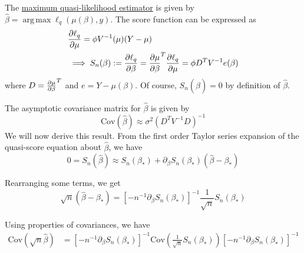 \documentclass[12pt]{article}
\newcommand{\Cov}{\mathrm{Cov}}
\newcommand{\bhat}{\hat{\beta}}
\DeclareMathOperator*{\argmax}{arg\,max}
\numberwithin{equation}{section}
\begin{document}
The \underline{maximum quasi-likelihood estimator} is given by $\bhat = \argmax \ell_q(\mu(\beta), y)$. The score function can be expressed as
\begin{align*}
  & \pdv{\ell_q}{\mu} = \phi V^{-1}(\mu) (Y - \mu) \\
  &\implies S_n(\beta) := \pdv{\ell_q}{\beta} = \pdv{\mu}{\beta}^T \pdv{\ell_q}{\mu} = \phi D^T V^{-1} e(\beta)
\end{align*}
%
where $D = \pdv{\mu}{\beta}^T$ and $e = Y - \mu(\beta)$. Of course, $S_n(\bhat) = 0$ by definition of $\bhat$.

The asymptotic covariance matrix for $\bhat$ is given by
\begin{equation*}
  \Cov(\bhat) \approx \sigma^2 (D^T V^{-1} D)^{-1}
\end{equation*}
%
We will now derive this result. From the first order Taylor series expansion of the quasi-score equation about $\bhat$, we have
%
\begin{equation*}
  0 = S_n(\bhat) \approx S_n(\beta_*) + \partial_{\beta} S_n(\beta_*) (\bhat - \beta_*)
\end{equation*}

Rearranging some terms, we get
\begin{equation*}
  \sqrt{n}(\bhat - \beta_*) = [-n^{-1} \partial_{\beta} S_n(\beta_*)]^{-1} \frac{1}{\sqrt{n}} S_n(\beta_*)
\end{equation*}

Using properties of covariances, we have
\begin{align*}
  \Cov(\sqrt{n}\bhat) 
    &= [-n^{-1} \partial_{\beta} S_n(\beta_*)]^{-1} 
      \Cov\left( \frac{1}{\sqrt{n}} S_n(\beta_*) \right)
      [-n^{-1} \partial_{\beta} S_n(\beta_*)]^{-1} 
\end{align*}
\end{document}
